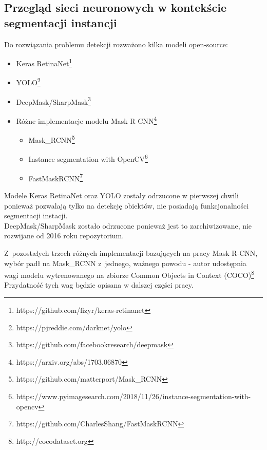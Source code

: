\subsection{Przegląd sieci neuronowych w kontekście segmentacji instancji}

Do rozwiązania problemu detekcji rozważono kilka modeli open-source:

\begin{itemize}
	\item Keras RetinaNet\footnote{https://github.com/fizyr/keras-retinanet}
	\item YOLO\footnote{https://pjreddie.com/darknet/yolo}
	\item DeepMask/SharpMask\footnote{https://github.com/facebookresearch/deepmask}
	\item Różne implementacje modelu Mask R-CNN\footnote{https://arxiv.org/abs/1703.06870}
		\begin{itemize}
			\item Mask\_RCNN\footnote{https://github.com/matterport/Mask\_RCNN}
			\item Instance segmentation with OpenCV\footnote{https://www.pyimagesearch.com/2018/11/26/instance-segmentation-with-opencv}
			\item FastMaskRCNN\footnote{https://github.com/CharlesShang/FastMaskRCNN}
		\end{itemize}
\end{itemize}

Modele Keras RetinaNet oraz YOLO zostały odrzucone w pierwszej chwili ponieważ pozwalają tylko na detekcję obiektów, nie posiadają funkcjonalności segmentacji instacji. \\

DeepMask/SharpMask zostało odrzucone ponieważ jest to zarchiwizowane, nie rozwijane od 2016 roku repozytorium.

Z~pozostałych trzech różnych implementacji bazujących na pracy Mask R-CNN, wybór padł na Mask\_RCNN z~jednego, ważnego powodu - autor udostępnia wagi modelu wytrenowanego na zbiorze Common Objects in Context (COCO)\footnote{http://cocodataset.org} Przydatność tych wag będzie opisana w dalszej części pracy.
